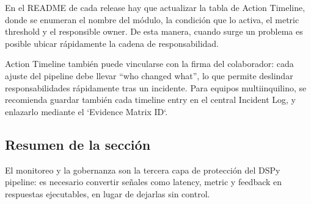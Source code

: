 En el README de cada release hay que actualizar la tabla de Action Timeline, donde se enumeran el nombre del módulo, la condición que lo activa, el metric threshold y el responsible owner. De esta manera, cuando surge un problema es posible ubicar rápidamente la cadena de responsabilidad.

Action Timeline también puede vincularse con la firma del colaborador: cada ajuste del pipeline debe llevar ``who changed what'', lo que permite deslindar responsabilidades rápidamente tras un incidente. Para equipos multiinquilino, se recomienda guardar también cada timeline entry en el central Incident Log, y enlazarlo mediante el `Evidence Matrix ID`.

\subsection{Resumen de la sección}

El monitoreo y la gobernanza son la tercera capa de protección del DSPy pipeline: es necesario convertir señales como latency, metric y feedback en respuestas ejecutables, en lugar de dejarlas sin control.

